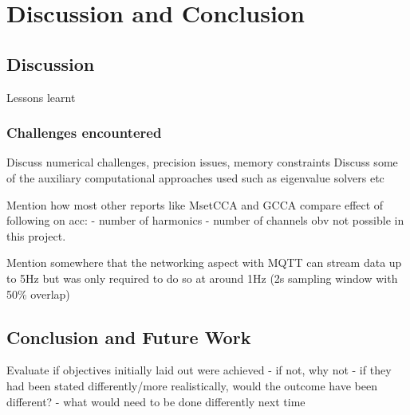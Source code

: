 \chapter{Discussion and Conclusion}
\label{chapter:discussion-conclusion}

\graphicspath{ {report/Chapter7/assets/} } 

\section{Discussion}
Lessons learnt

\subsection{Challenges encountered}
Discuss numerical challenges, precision issues, memory constraints
Discuss some of the auxiliary computational approaches used such as eigenvalue solvers etc

Mention how most other reports like MsetCCA and GCCA compare effect of following on acc:
- number of harmonics 
- number of channels
obv not possible in this project.

Mention somewhere that the networking aspect with MQTT can stream data up to 5Hz but was only required to do so at around 1Hz (2s sampling window with 50\% overlap)



\section{Conclusion and Future Work}
Evaluate if objectives initially laid out were achieved
- if not, why not
- if they had been stated differently/more realistically, would the outcome have been different?
- what would need to be done differently next time

